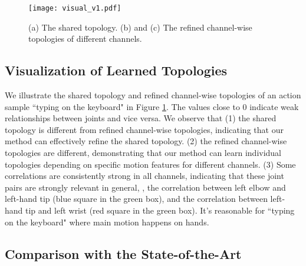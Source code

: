 \documentclass[10pt,twocolumn,letterpaper]{article}
\begin{document}
\begin{figure}[t]
	\centering
	\texttt{[image: visual\_v1.pdf]} \caption{(a) The shared topology. (b) and (c) The refined channel-wise topologies of different channels.}
	\vspace{-0.2cm}
	\label{fig:correlation}
\end{figure}

\subsection{Visualization of Learned Topologies}
We illustrate the shared topology and refined channel-wise topologies of an action sample ``typing on the keyboard" in Figure \ref{fig:correlation}. The values close to 0 indicate weak relationships between joints and vice versa. We observe that (1) the shared topology is different from refined channel-wise topologies, indicating that our method can effectively refine the shared topology. (2) the refined channel-wise topologies are different, demonstrating that our method can learn individual topologies depending on specific motion features for different channels. (3) Some correlations are consistently strong in all channels, indicating that these joint pairs are strongly relevant in general, \eg, the correlation between left elbow and left-hand tip (blue square in the green box), and the correlation between left-hand tip and left wrist (red square in the green box). It's reasonable for ``typing on the keyboard" where main motion happens on hands.

\subsection{Comparison with the State-of-the-Art}
\end{document}
